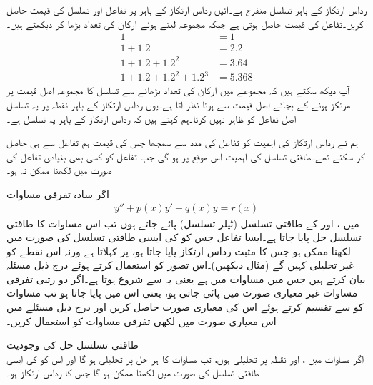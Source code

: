 رداس ارتکاز کے باہر تسلسل منفرج ہے۔آئیں رداس ارتکاز کے باہر  پر تفاعل اور تسلسل کی قیمت حاصل کریں۔تفاعل کی قیمت  حاصل ہوتی ہے جبکہ مجموعہ لیتے ہوئے ارکان کی تعداد بڑھا کر دیکھتے ہیں۔ 
\begin{align*}
1&=1 \\
1+1.2&=2.2\\
1+1.2+1.2^2&=3.64\\
1+1.2+1.2^2+1.2^3&=5.368
\end{align*}
آپ دیکھ سکتے ہیں کہ مجموعے میں ارکان کی تعداد بڑھانے سے تسلسل کا مجموعہ اصل قیمت پر مرتکز ہونے کے بجائے اصل قیمت سے  ہوتا نظر آتا ہے۔یوں رداس ارتکاز کے باہر نقطہ  پر یہ تسلسل اصل تفاعل کو ظاہر نہیں کرتا۔ہم کہتے ہیں کہ رداس ارتکاز کے باہر یہ تسلسل  ہے۔

ہم نے رداس ارتکاز کی اہمیت کو تفاعل  کی مدد سے سمجھا جس کی قیمت ہم تفاعل سے ہی حاصل کر سکتے تھے۔طاقتی تسلسل کی اہمیت اس موقع پر ہو گی جب تفاعل کو کسی بھی بنیادی تفاعل کی صورت میں لکھنا ممکن نہ ہو۔


اگر سادہ تفرقی مساوات
\begin{align}\label{مساوات_بیسل_معیاری_تفرقی_مساوات_الف}
y''+p(x)y'+q(x)y=r(x)
\end{align}
میں ،  اور  کے طاقتی تسلسل (ٹیلر تسلسل) پائے جاتے ہوں تب اس مساوات کا طاقتی تسلسل حل پایا جاتا ہے۔ایسا تفاعل  جس کو  کی ایسی طاقتی تسلسل کی صورت میں لکھنا ممکن ہو جس کا مثبت رداس ارتکاز پایا جاتا ہو،  پر  کہلاتا ہے ورنہ اس نقطے کو غیر تحلیلی کہیں گے (مثال  دیکھیں)۔اس تصور کو استعمال کرتے ہوئے درج ذیل مسئلہ بیان کرتے ہیں جس میں مساوات   میں ہے یعنی یہ  سے شروع ہوتا ہے۔اگر دو رتبی تفرقی مساوات غیر معیاری صورت میں پائی جاتی ہو، یعنی اس میں  پایا جاتا ہو تب مساوات کو  سے تقسیم کرتے ہوئے اس کی معیاری صورت حاصل کریں اور درج ذیل مسئلے میں اس معیاری صورت میں لکھی تفرقی مساوات کو استعمال کریں۔

\quad طاقتی تسلسل حل کی وجودیت\\
اگر مساوات  میں ،  اور  نقطہ  پر تحلیلی ہوں، تب مساوات  کا ہر حل  پر تحلیلی ہو گا اور اس کو  کی ایسی طاقتی تسلسل کی صورت میں لکھنا ممکن ہو گا جس کا رداس ارتکاز  ہو۔

